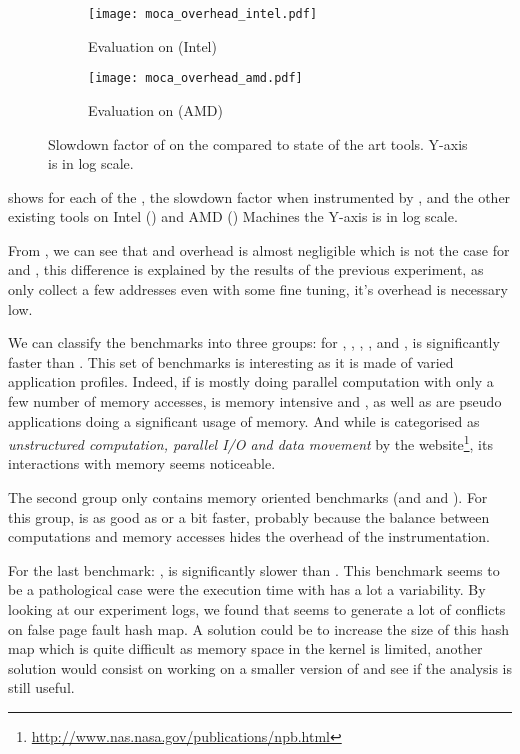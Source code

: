 \begin{figure}[htb]
    \centering
    \begin{subfigure}{\linewidth}
        \texttt{[image: moca\_overhead\_intel.pdf]}
        \caption{Evaluation on \Edel (Intel)}
        \label{fig:ovh-Intel}
    \end{subfigure}
    \begin{subfigure}{\linewidth}
        \texttt{[image: moca\_overhead\_amd.pdf]}
        \caption{Evaluation on \Idfreeze (AMD)}
        \label{fig:ovh-AMD}
    \end{subfigure}
    \caption{Slowdown factor of \Moca on the \NPB compared to state of the art tools.
    Y-axis is in log scale.}
    \label{fig:ovh}
\end{figure}

 shows for each of the \NPB, the slowdown factor when
instrumented by \Moca, \MocaPin and the other existing tools on Intel
() and AMD () Machines the Y-axis is in
log scale.

From , we can see that \Mitos and \MitosTun overhead is
almost negligible which is not the case for \Moca and \TABARNAC, this
difference is explained by the results of the previous experiment, as \Mitos
only collect a few addresses even with some fine tuning, it's overhead is
necessary low.

We can classify the benchmarks into three groups:
for \BT, \CG, \EP, \LU, \SP and \UA, \Moca is
significantly faster than \TABARNAC. This set of benchmarks is interesting as it is made of varied application profiles.
Indeed, if \EP is mostly doing parallel computation with only a few number of
memory accesses, \CG is memory intensive and
\BT, \LU as well as \SP are pseudo applications doing a significant usage of memory.
And while \UA is categorised as \emph{unstructured computation,
parallel I/O and data movement} by the \NPB
website\footnote{\url{http://www.nas.nasa.gov/publications/npb.html}}, its
interactions with memory seems noticeable.

The second group only contains memory oriented benchmarks (\DC and \FT and
\IS). For this group, \Moca is as good as \TABARNAC or a bit faster, probably
because the balance between computations and memory accesses hides the
overhead of the instrumentation.

For the last benchmark: \MG, \Moca is significantly slower than \TABARNAC. This benchmark
seems to be a pathological case were the execution time with \Moca has a lot a
variability. By looking at our experiment logs, we found that \MG seems to
generate a lot of conflicts on \Moca false page fault hash map. A solution
could be to increase the size of this hash map which is quite difficult as
memory space in the kernel is limited, another solution would consist on
working on a smaller version of \MG and see if the analysis is still useful.


